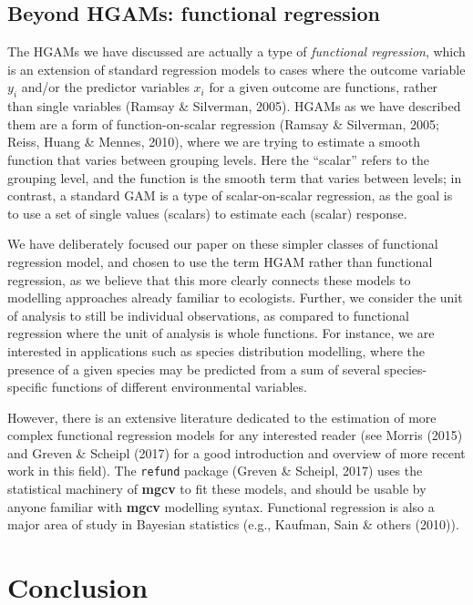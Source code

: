 \documentclass[12pt]{article}
\begin{document}
\subsection{Beyond HGAMs: functional
regression}\label{beyond-hgams-functional-regression}

The HGAMs we have discussed are actually a type of \emph{functional
regression}, which is an extension of standard regression models to
cases where the outcome variable \(y_i\) and/or the predictor variables
\(x_i\) for a given outcome are functions, rather than single variables
(Ramsay \& Silverman, 2005). HGAMs as we have described them are a form
of function-on-scalar regression (Ramsay \& Silverman, 2005; Reiss,
Huang \& Mennes, 2010), where we are trying to estimate a smooth
function that varies between grouping levels. Here the ``scalar'' refers
to the grouping level, and the function is the smooth term that varies
between levels; in contrast, a standard GAM is a type of
scalar-on-scalar regression, as the goal is to use a set of single
values (scalars) to estimate each (scalar) response.

We have deliberately focused our paper on these simpler classes of
functional regression model, and chosen to use the term HGAM rather than
functional regression, as we believe that this more clearly connects
these models to modelling approaches already familiar to ecologists.
Further, we consider the unit of analysis to still be individual
observations, as compared to functional regression where the unit of
analysis is whole functions. For instance, we are interested in
applications such as species distribution modelling, where the presence
of a given species may be predicted from a sum of several
species-specific functions of different environmental variables.

However, there is an extensive literature dedicated to the estimation of
more complex functional regression models for any interested reader (see
Morris (2015) and Greven \& Scheipl (2017) for a good introduction and
overview of more recent work in this field). The \texttt{refund} package
(Greven \& Scheipl, 2017) uses the statistical machinery of
\textbf{mgcv} to fit these models, and should be usable by anyone
familiar with \textbf{mgcv} modelling syntax. Functional regression is
also a major area of study in Bayesian statistics (e.g., Kaufman, Sain
\& others (2010)).

\section{Conclusion}\label{conclusion}
\end{document}
